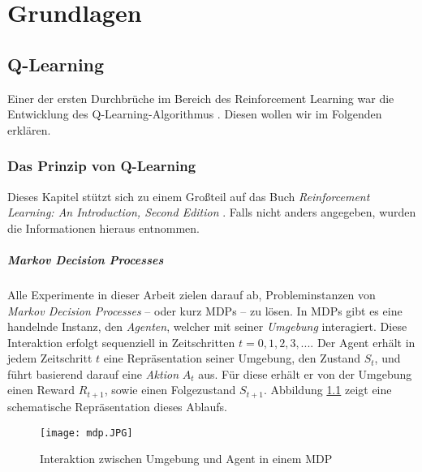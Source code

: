 \chapter{Grundlagen} \label{sec:basics}
\section{Q-Learning}
Einer der ersten Durchbrüche im Bereich des Reinforcement Learning war die Entwicklung des Q-Learning-Algorithmus \cite{06_sutton2018reinforcement}. Diesen wollen wir im Folgenden erklären.

\subsection{Das Prinzip von Q-Learning}
Dieses Kapitel stützt sich zu einem Großteil auf das Buch \textit{Reinforcement Learning: An Introduction, Second Edition} \cite{06_sutton2018reinforcement}. Falls nicht anders angegeben, wurden die Informationen hieraus entnommen.

\paragraph{Markov Decision Processes}
Alle Experimente in dieser Arbeit zielen darauf ab, Probleminstanzen von \textit{Markov Decision Processes} -- oder kurz MDPs -- zu lösen. In MDPs gibt es eine handelnde Instanz, den \textit{Agenten}, welcher mit seiner \textit{Umgebung} interagiert. Diese Interaktion erfolgt sequenziell in Zeitschritten $ t = 0, 1, 2, 3, ... $. Der Agent erhält in jedem Zeitschritt $ t $ eine Repräsentation seiner Umgebung, den Zustand $ S_t $, und führt basierend darauf eine \textit{Aktion} $ A_t $ aus. Für diese erhält er von der Umgebung einen Reward $ R_{t + 1} $, sowie einen Folgezustand $ S_{t + 1} $. Abbildung \ref{img:mdp} zeigt eine schematische Repräsentation dieses Ablaufs.
\begin{figure}[h!]
    \centering
    \texttt{[image: mdp.JPG]}
    \caption{Interaktion zwischen Umgebung und Agent in einem MDP} \label{img:mdp}
\end{figure}

